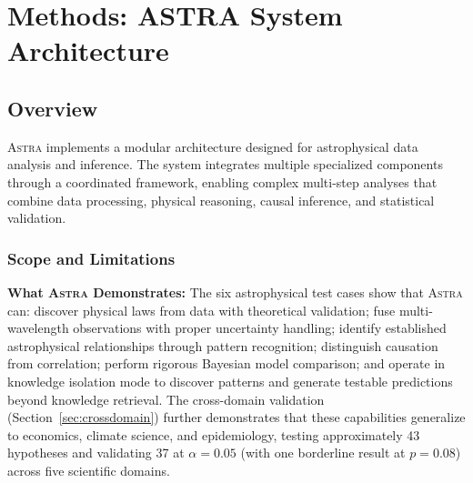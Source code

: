 \documentclass[usenatbib]{rasti}
\newcommand{\astra}{\textsc{Astra}\xspace}
\begin{document}
\section{Methods: ASTRA System Architecture}
\label{sec:methods}

\subsection{Overview}
\label{sec:methods:overview}

\astra implements a modular architecture designed for astrophysical data analysis and inference.
The system integrates multiple specialized components through a coordinated framework, enabling complex multi-step analyses that combine data processing, physical reasoning, causal inference, and statistical validation.

\subsubsection{Scope and Limitations}
\label{sec:scope}

\textbf{What \astra Demonstrates:}
The six astrophysical test cases show that \astra can: discover physical laws from data with theoretical validation; fuse multi-wavelength observations with proper uncertainty handling; identify established astrophysical relationships through pattern recognition; distinguish causation from correlation; perform rigorous Bayesian model comparison; and operate in knowledge isolation mode to discover patterns and generate testable predictions beyond knowledge retrieval.
The cross-domain validation (Section~\ref{sec:crossdomain}) further demonstrates that these capabilities generalize to economics, climate science, and epidemiology, testing approximately 43 hypotheses and validating 37 at $\alpha=0.05$ (with one borderline result at $p=0.08$) across five scientific domains.
\end{document}
